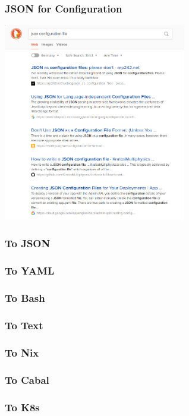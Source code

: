 \documentclass{beamer}
\begin{document}
 \begin{frame}
   \frametitle{JSON for Configuration}
   \begin{center}
     \includegraphics[width=0.6\textwidth]{static-images/duckduckgo-dont-use-json.png}
   \end{center}
 \end{frame}

 \begin{frame}
   \frametitle{To JSON}
 \end{frame}

 \begin{frame}
   \frametitle{To YAML}
 \end{frame}

 \begin{frame}
   \frametitle{To Bash}
 \end{frame}

 \begin{frame}
   \frametitle{To Text}
 \end{frame}

 \begin{frame}
   \frametitle{To Nix}
 \end{frame}

 \begin{frame}
   \frametitle{To Cabal}
 \end{frame}

 \begin{frame}
   \frametitle{To K8s}
 \end{frame}
\end{document}
